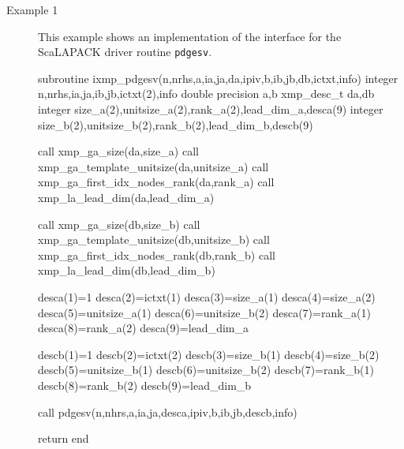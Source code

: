 
\begin{description}

 \item[Example 1]
	    This example shows an implementation of the interface for
	    the ScaLAPACK driver routine {\tt pdgesv}.

\begin{XFexample}
      subroutine ixmp_pdgesv(n,nrhs,a,ia,ja,da,ipiv,b,ib,jb,db,ictxt,info)
      integer n,nrhs,ia,ja,ib,jb,ictxt(2),info
      double precision a,b
      xmp_desc_t da,db
      integer size_a(2),unitsize_a(2),rank_a(2),lead_dim_a,desca(9)
      integer size_b(2),unitsize_b(2),rank_b(2),lead_dim_b,descb(9)
      
      call xmp_ga_size(da,size_a)
      call xmp_ga_template_unitsize(da,unitsize_a)
      call xmp_ga_first_idx_nodes_rank(da,rank_a)
      call xmp_la_lead_dim(da,lead_dim_a)
      
      call xmp_ga_size(db,size_b)
      call xmp_ga_template_unitsize(db,unitsize_b)
      call xmp_ga_first_idx_nodes_rank(db,rank_b)
      call xmp_la_lead_dim(db,lead_dim_b)
      
      desca(1)=1
      desca(2)=ictxt(1)
      desca(3)=size_a(1)
      desca(4)=size_a(2)
      desca(5)=unitsize_a(1)
      desca(6)=unitsize_b(2)
      desca(7)=rank_a(1)
      desca(8)=rank_a(2)
      desca(9)=lead_dim_a
      
      descb(1)=1
      descb(2)=ictxt(2)
      descb(3)=size_b(1)
      descb(4)=size_b(2)
      descb(5)=unitsize_b(1)
      descb(6)=unitsize_b(2)
      descb(7)=rank_b(1)
      descb(8)=rank_b(2)
      descb(9)=lead_dim_b
      
      call pdgesv(n,nhrs,a,ia,ja,desca,ipiv,b,ib,jb,descb,info)
      
      return
      end


\end{XFexample}
\end{description}
